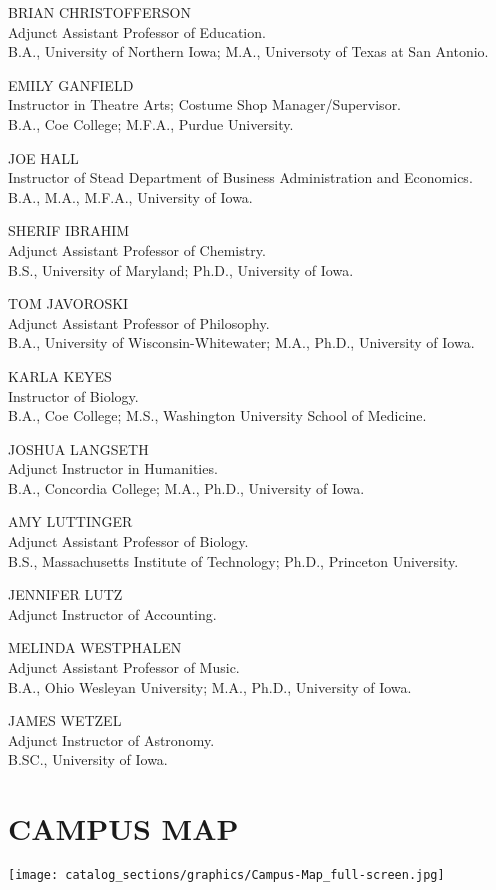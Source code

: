 \documentclass[
  letterpaper,
]{scrbook}
\newcommand{\pandocbounded}[1]{#1}
\begin{document}
BRIAN CHRISTOFFERSON\\
Adjunct Assistant Professor of Education.\\
B.A., University of Northern Iowa; M.A., Universoty of Texas at San
Antonio.

EMILY GANFIELD\\
Instructor in Theatre Arts; Costume Shop Manager/Supervisor.\\
B.A., Coe College; M.F.A., Purdue University.

JOE HALL\\
Instructor of Stead Department of Business Administration and
Economics.\\
B.A., M.A., M.F.A., University of Iowa.

SHERIF IBRAHIM\\
Adjunct Assistant Professor of Chemistry.\\
B.S., University of Maryland; Ph.D., University of Iowa.

TOM JAVOROSKI\\
Adjunct Assistant Professor of Philosophy.\\
B.A., University of Wisconsin-Whitewater; M.A., Ph.D., University of
Iowa.

KARLA KEYES\\
Instructor of Biology.\\
B.A., Coe College; M.S., Washington University School of Medicine.

JOSHUA LANGSETH\\
Adjunct Instructor in Humanities.\\
B.A., Concordia College; M.A., Ph.D., University of Iowa.

AMY LUTTINGER\\
Adjunct Assistant Professor of Biology.\\
B.S., Massachusetts Institute of Technology; Ph.D., Princeton
University.

JENNIFER LUTZ\\
Adjunct Instructor of Accounting.

MELINDA WESTPHALEN\\
Adjunct Assistant Professor of Music.\\
B.A., Ohio Wesleyan University; M.A., Ph.D., University of Iowa.

JAMES WETZEL\\
Adjunct Instructor of Astronomy.\\
B.SC., University of Iowa.

\chapter{CAMPUS MAP}\label{sec-campus-map}

\begin{center}
\pandocbounded{\texttt{[image: catalog\_sections/graphics/Campus-Map\_full-screen.jpg]}}
\end{center}

\backmatter
\printindex
\end{document}
